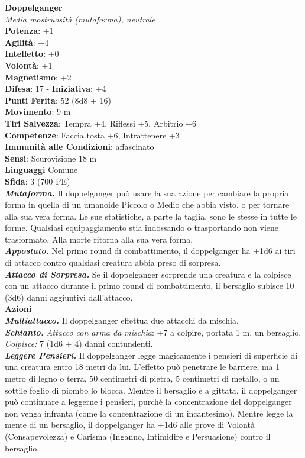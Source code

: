 \begin{multicols}{2}
\medskip\textbf{Doppelganger}\\
\emph{Media mostruosità (mutaforma), neutrale}\\
\textbf{Potenza}: +1\\
\textbf{Agilità}: +4\\
\textbf{Intelletto}: +0\\
\textbf{Volontà}: +1\\
\textbf{Magnetismo}: +2\\
\textbf{Difesa}: 17 - \textbf{Iniziativa}: +4\\
\textbf{Punti Ferita}: 52 (8d8 + 16)\\
\textbf{Movimento}: 9 m\\
\textbf{Tiri Salvezza}: Tempra +4, Riflessi +5, Arbitrio +6\\
\textbf{Competenze}: Faccia tosta +6, Intrattenere +3\\
\textbf{Immunità alle Condizioni}: affascinato\\
\textbf{Sensi}: Scurovisione 18 m\\
\textbf{Linguaggi} Comune\\
\textbf{Sfida}: 3 (700 PE)\smallskip\\
\emph{\textbf{Mutaforma.}} Il doppelganger può usare la sua azione per cambiare la propria forma in quella di un umanoide Piccolo o Medio che abbia visto, o per tornare alla sua vera forma. Le sue statistiche, a parte la taglia, sono le stesse in tutte le forme. Qualsiasi equipaggiamento stia indossando o trasportando non viene trasformato.  Alla morte ritorna alla sua vera forma.\\
\emph{\textbf{Appostato.}} Nel primo round di combattimento, il doppelganger ha +1d6 ai tiri di attacco contro qualsiasi creatura abbia preso di sorpresa.\\
\emph{\textbf{Attacco di Sorpresa.}} Se il doppelganger sorprende una creatura e la colpisce con un attacco durante il primo round di combattimento, il bersaglio subisce 10 (3d6) danni aggiuntivi dall'attacco.\\
\smallskip\textbf{Azioni}\\
\emph{\textbf{Multiattacco.}} Il doppelganger effettua due attacchi da mischia.\\
\emph{\textbf{Schianto.} Attacco con arma da mischia}: +7 a colpire, portata 1 m, un bersaglio.\\
\emph{Colpisce:} 7 (1d6 + 4) danni contundenti.\\
\emph{\textbf{Leggere Pensieri.}} Il doppelganger legge magicamente i pensieri di superficie di una creatura entro 18 metri da lui. L'effetto può penetrare le barriere, ma 1 metro di legno o terra, 50 centimetri di pietra, 5 centimetri di metallo, o un sottile foglio di piombo lo blocca. Mentre il bersaglio è a gittata, il doppelganger può continuare a leggerne i pensieri, purché la concentrazione del doppelganger non venga infranta (come la concentrazione di un incantesimo). Mentre legge la mente di un bersaglio, il doppelganger ha +1d6 alle prove di Volontà (Consapevolezza) e Carisma (Inganno, Intimidire e Persuasione) contro il bersaglio.\\

\end{multicols}
